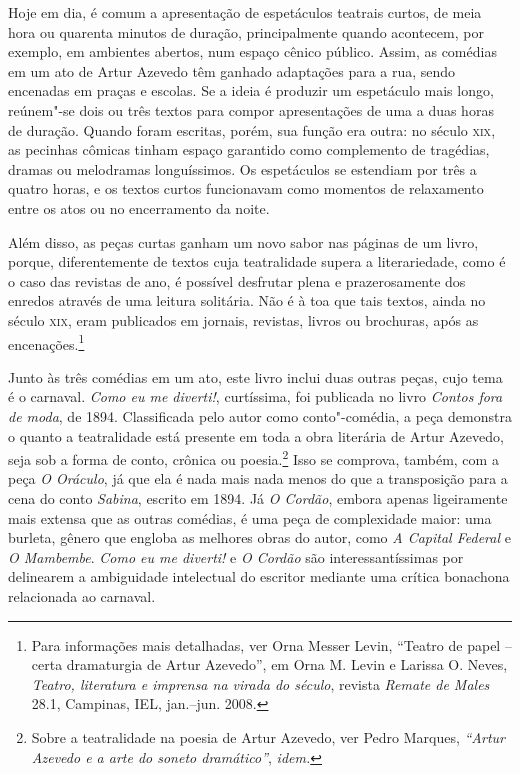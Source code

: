 Hoje em dia, é comum a apresentação de espetáculos teatrais curtos, de
meia hora ou quarenta minutos de duração, principalmente quando acontecem, por exemplo, em ambientes abertos, num espaço cênico
público. Assim, as comédias em um ato de Artur Azevedo têm ganhado
adaptações para a rua, sendo encenadas em praças e escolas. Se a ideia é
produzir um espetáculo mais longo, reúnem"-se dois ou três textos para
compor apresentações de uma a duas horas de duração. Quando foram
escritas, porém, sua função era outra: no século \textsc{xix}, as pecinhas
cômicas tinham espaço garantido como complemento de tragédias, dramas
ou melodramas longuíssimos. Os espetáculos se estendiam por três a
quatro horas, e os textos curtos funcionavam como momentos de
relaxamento entre os atos ou no encerramento da noite. 

Além disso, as peças curtas ganham um novo sabor nas páginas de um
livro, porque, diferentemente de textos cuja teatralidade supera a
literariedade, como é o caso das revistas de ano, é possível desfrutar
plena e prazerosamente dos enredos através de uma leitura solitária.
Não é à toa que tais textos, ainda no século \textsc{xix}, eram publicados em
jornais, revistas, livros ou brochuras, após as encenações.\footnote{
Para informações mais detalhadas, ver Orna Messer Levin, “Teatro de papel -- certa dramaturgia de Artur Azevedo”, em Orna M. Levin e Larissa O. Neves, \textit{Teatro,
literatura e imprensa na virada do século}, revista \textit{Remate de
Males }28.1, Campinas, IEL, jan.--jun.
2008.}

Junto às três comédias em um ato, este livro inclui duas outras peças,
cujo tema é o carnaval. \textit{Como eu me diverti!}, curtíssima, foi
publicada no livro \textit{Contos fora de moda}, de 1894. Classificada
pelo autor como conto"-comédia, a peça demonstra o quanto a teatralidade
está presente em toda a obra literária de Artur Azevedo, seja sob a
forma de conto, crônica ou poesia.\footnote{ Sobre a teatralidade na
poesia de Artur Azevedo, ver Pedro Marques, \textit{``Artur
Azevedo e a arte do soneto dramático''}, \textit{idem.}} Isso se comprova,
também, com a peça \textit{O Oráculo}, já que ela é nada mais nada
menos do que a transposição para a cena do conto \textit{Sabina},
escrito em 1894. Já \textit{O Cordão}, embora apenas ligeiramente mais
extensa que as outras comédias, é uma peça de complexidade maior: uma
burleta, gênero que engloba as melhores obras do autor, como \textit{A
Capital Federal} e \textit{O Mambembe}. \textit{Como eu me diverti!} e
\textit{O Cordão} são interessantíssimas por delinearem a ambiguidade
intelectual do escritor mediante uma crítica bonachona relacionada ao
carnaval. 

